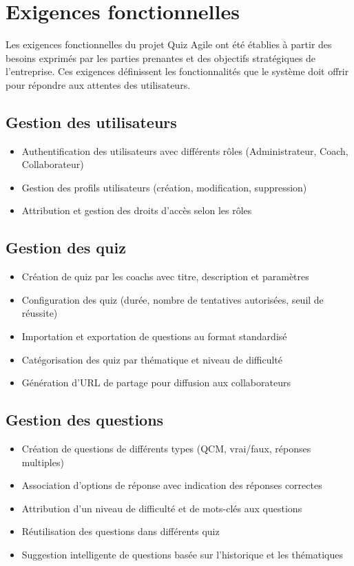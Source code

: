 \documentclass[12pt,a4paper]{report}
\begin{document}
\section{Exigences fonctionnelles}

Les exigences fonctionnelles du projet Quiz Agile ont été établies à partir des besoins exprimés par les parties prenantes et des objectifs stratégiques de l'entreprise. Ces exigences définissent les fonctionnalités que le système doit offrir pour répondre aux attentes des utilisateurs.

\subsection{Gestion des utilisateurs}

\begin{itemize}
\item Authentification des utilisateurs avec différents rôles (Administrateur, Coach, Collaborateur)
\item Gestion des profils utilisateurs (création, modification, suppression)
\item Attribution et gestion des droits d'accès selon les rôles
\end{itemize}

\subsection{Gestion des quiz}

\begin{itemize}
\item Création de quiz par les coachs avec titre, description et paramètres
\item Configuration des quiz (durée, nombre de tentatives autorisées, seuil de réussite)
\item Importation et exportation de questions au format standardisé
\item Catégorisation des quiz par thématique et niveau de difficulté
\item Génération d'URL de partage pour diffusion aux collaborateurs
\end{itemize}

\subsection{Gestion des questions}

\begin{itemize}
\item Création de questions de différents types (QCM, vrai/faux, réponses multiples)
\item Association d'options de réponse avec indication des réponses correctes
\item Attribution d'un niveau de difficulté et de mots-clés aux questions
\item Réutilisation des questions dans différents quiz
\item Suggestion intelligente de questions basée sur l'historique et les thématiques
\end{itemize}
\end{document}
